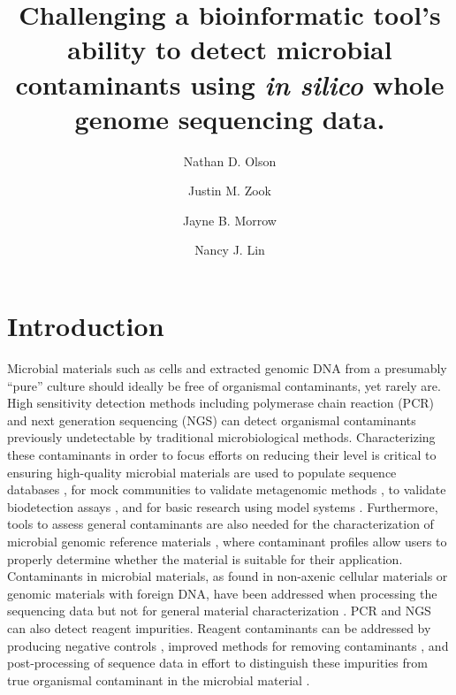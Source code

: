 \documentclass[fleqn,10pt,lineno]{wlpeerj}\usepackage[]{graphicx}\usepackage[]{color}
\title{Challenging a bioinformatic tool's ability to detect microbial contaminants using \textit{in silico} whole genome sequencing data.}
\author[1]{Nathan D. Olson}
\author[1]{Justin M. Zook}
\author[1]{Jayne B. Morrow}
\author[1]{Nancy J. Lin}
\affil[1]{Material Measurement Laboratory, National Institute of Standards and Technology}
\begin{document}
\flushbottom
\maketitle
\thispagestyle{empty}

\section*{Introduction} 
Microbial materials such as cells and extracted genomic DNA from a presumably “pure” culture should ideally be free of organismal contaminants, yet rarely are. 
High sensitivity detection methods including polymerase chain reaction (PCR) and next generation sequencing (NGS) can detect organismal contaminants previously undetectable by traditional microbiological methods. 
Characterizing these contaminants in order to focus efforts on reducing their level is critical to ensuring high-quality microbial materials are used to populate sequence databases \citep{parks2015checkm}, for mock communities to validate metagenomic methods \citep{bokulich2016mockrobiota}, to validate biodetection assays  \citep{Ieven2013,International2011}, and for basic research using model systems \citep{Shrestha2013}. 
Furthermore, tools to assess general contaminants are also needed for the characterization of microbial genomic reference materials \citep{olson2016pepr}, where contaminant profiles allow users to properly determine whether the material is suitable for their application. 
Contaminants in microbial materials, as found in non-axenic cellular materials or genomic materials with foreign DNA, have been addressed when processing the sequencing data but not for general material characterization \citep{Shrestha2013,tennessen2015prodege}.
PCR and NGS can also detect reagent impurities. 
Reagent contaminants can be addressed by producing negative controls \citep{jervis2015deriving}, improved methods for removing contaminants \citep{woyke2011decontamination,motley2014improved}, and post-processing of sequence data in effort to distinguish these impurities from true organismal contaminant in the microbial material \citep{mukherjee2015large}. 
\end{document}
